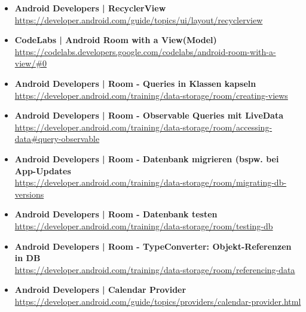 \documentclass[a4paper]{article}
\begin{document}
{\begin{itemize}
		\item \textbf{Android Developers | RecyclerView}\\
		\href{https://developer.android.com/guide/topics/ui/layout/recyclerview}
		{https://developer.android.com/guide/topics/ui/layout/recyclerview}
		
		\item \textbf{CodeLabs | Android Room with a View(Model)}\\
		\href{https://codelabs.developers.google.com/codelabs/android-room-with-a-view/#0}
		{https://codelabs.developers.google.com/codelabs/android-room-with-a-view/\#0}
		
		\item \textbf{Android Developers | Room - Queries in Klassen kapseln}\\
		\href{https://developer.android.com/training/data-storage/room/creating-views}
		{https://developer.android.com/training/data-storage/room/creating-views}
		
		\item \textbf{Android Developers | Room - Observable Queries mit LiveData}\\
		\href{https://developer.android.com/training/data-storage/room/accessing-data#query-observable}
		{https://developer.android.com/training/data-storage/room/accessing-data\#query-observable}
		
		\item \textbf{Android Developers | Room - Datenbank migrieren (bspw. bei App-Updates}\\
		\href{https://developer.android.com/training/data-storage/room/migrating-db-versions}
		{https://developer.android.com/training/data-storage/room/migrating-db-versions}
		
		\item \textbf{Android Developers | Room - Datenbank testen}\\
		\href{https://developer.android.com/training/data-storage/room/testing-db}
		{https://developer.android.com/training/data-storage/room/testing-db}
		
		\item \textbf{Android Developers | Room - TypeConverter: Objekt-Referenzen in DB}\\
		\href{https://developer.android.com/training/data-storage/room/referencing-data}
		{https://developer.android.com/training/data-storage/room/referencing-data}
		
		\item \textbf{Android Developers | Calendar Provider}\\
		\href{https://developer.android.com/guide/topics/providers/calendar-provider.html}
		{https://developer.android.com/guide/topics/providers/calendar-provider.html}
		

\end{itemize}}
\end{document}
